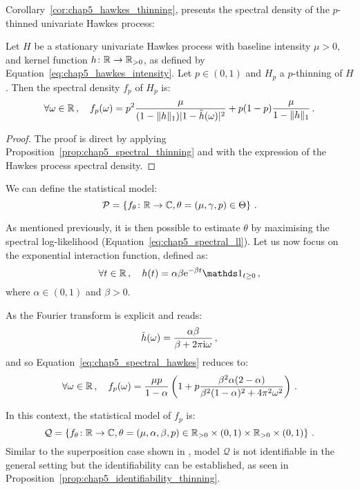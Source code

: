     Corollary~\ref{cor:chap5_hawkes_thinning}, presents the spectral density of the $p$-thinned univariate Hawkes process:

    \begin{corollary}\label{cor:chap5_hawkes_thinning}
        Let $H$ be a stationary univariate Hawkes process with baseline intensity $\mu > 0$, and kernel function $h\colon {\mathbb R}\to {\mathbb R}_{>0}$,
        as defined by Equation~\eqref{eq:chap5_hawkes_intensity}. Let $p\in(0,1)$ and $H_p$ a $p$-thinning of $H$. 
        Then the spectral density $f_p$ of $H_p$ is:
        \begin{equation}\label{eq:chap5_spectral_hawkes}
            \forall \omega \in {\mathbb R}\,, \quad f_p(\omega) = p^2 \frac{\mu}{(1-\|h\|_1)|1-\tilde h(\omega)|^2} + p(1-p)\frac{\mu}{1-\|h\|_1}\,.
        \end{equation}
    \end{corollary}
    \begin{proof}
        The proof is direct by applying Proposition~\ref{prop:chap5_spectral_thinning} and 
        with the expression of the Hawkes process spectral density.
    \end{proof}
    We can define the statistical model:
    \[\mathcal{P} = 
      \left\{
        f_\theta \colon {\mathbb R} \to {\mathbb C}, \theta = (\mu, \gamma, p) \in \Theta
      \right\}\,.
    \]

    As mentioned previously, it is then possible to estimate $\theta$ by maximising the spectral log-likelihood (Equation~\eqref{eq:chap5_spectral_ll}).
    Let us now focus on the exponential interaction function, defined as:
    \[\forall t\in\RR\,,\quad h(t) = \alpha \beta \mathrm{e}^{-\beta t}\II_{t\geq 0}\,,\]
    where $\alpha \in(0,1)$ and $\beta > 0$.

    As the Fourier transform is explicit and reads:
    \[\tilde h (\omega) = \frac{\alpha \beta}{\beta + 2 \pi \mathrm{i} \omega}\,,\]
    and so Equation~\eqref{eq:chap5_spectral_hawkes} reduces to:
    \begin{equation}\label{eq:chap5_spectral_exponential}
        \forall \omega\in{\mathbb R}\,,\quad
        f_p(\omega) = \frac{\mu p }{1-\alpha}\left(1 + p \frac{\beta^2 \alpha (2-\alpha)}{\beta^2(1-\alpha)^2 + 4 \pi^2 \omega^2}\right)\,.
    \end{equation}

    In this context, the statistical model of $f_p$ is:
    \[\mathcal{Q} = 
      \left\{
        f_\theta \colon {\mathbb R} \to {\mathbb C}, 
        \theta = (\mu, \alpha, \beta, p) \in {\mathbb R}_{>0}\times (0,1) \times {\mathbb R}_{>0}\times(0,1)
      \right\}\,.
    \]
    Similar to the superposition case shown in \textcite[Proposition 3.2]{Bonnet2024}, 
    model $\mathcal{Q}$ is not identifiable in the general setting but the identifiability can be established, as seen in Proposition~\ref{prop:chap5_identifiability_thinning}.

